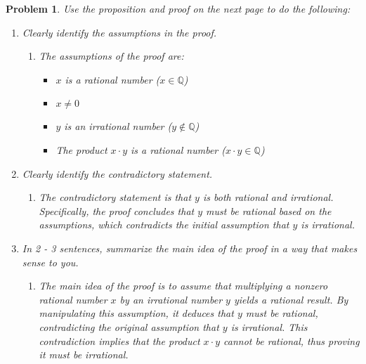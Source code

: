 \documentclass[12pt]{article}
\newtheorem{problem}{Problem} %
\theoremstyle{definition}
\begin{document}
\begin{problem}
Use the proposition and proof on the next page to do the following:
\begin{enumerate}[label=(\alph*)]
    \item Clearly identify the assumptions in the proof.
    \begin{enumerate}[label=(\alph*)]
        \item The assumptions of the proof are:
        \begin{itemize}
            \item \( x \) is a rational number (\( x \in \mathbb{Q} \))
            \item \( x \neq 0 \)
            \item \( y \) is an irrational number (\( y \notin \mathbb{Q} \))
            \item The product \( x \cdot y \) is a rational number (\( x \cdot y \in \mathbb{Q} \))
        \end{itemize}
    \end{enumerate}
    
    \item Clearly identify the contradictory statement.
    \begin{enumerate}[label=(\alph*)]
        \item The contradictory statement is that \( y \) is both rational and irrational. Specifically, the proof concludes that \( y \) must be rational based on the assumptions, which contradicts the initial assumption that \( y \) is irrational.
    \end{enumerate}
    
    \item In 2 - 3 sentences, summarize the main idea of the proof in a way that makes sense to you.
    \begin{enumerate}[label=(\alph*)]
        \item The main idea of the proof is to assume that multiplying a nonzero rational number \( x \) by an irrational number \( y \) yields a rational result. By manipulating this assumption, it deduces that \( y \) must be rational, contradicting the original assumption that \( y \) is irrational. This contradiction implies that the product \( x \cdot y \) cannot be rational, thus proving it must be irrational.
    \end{enumerate}
    
\end{enumerate}

\end{problem}
\end{document}
